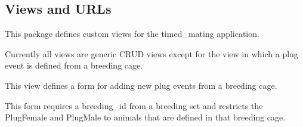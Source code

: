 \documentclass[letterpaper,10pt,english]{sphinxmanual}
\begin{document}
\begin{fulllineitems}
\begin{fulllineitems}
\end{fulllineitems}



\subsection{Views and URLs}
\label{api:id8}\label{api:module-timed_mating.views}
This package defines custom views for the timed\_mating application.

Currently all views are generic CRUD views except for the view in which a plug event is defined from a breeding cage.

\begin{fulllineitems}
\label{api:timed_mating.views.breeding_plugevent}
This view defines a form for adding new plug events from a breeding cage.

This form requires a breeding\_id from a breeding set and restricts the PlugFemale and PlugMale to animals that are defined in that breeding cage.

\end{fulllineitems}

\label{api:module-timed_mating.urls}

\begin{fulllineitems}
\label{api:timed_mating.urls.change_plugevents}
\end{fulllineitems}


\begin{fulllineitems}
\label{api:timed_mating.urls.create_plugevents}
\end{fulllineitems}


\begin{fulllineitems}
\label{api:timed_mating.urls.delete_plugevents}
\end{fulllineitems}


\end{fulllineitems}
\end{document}
